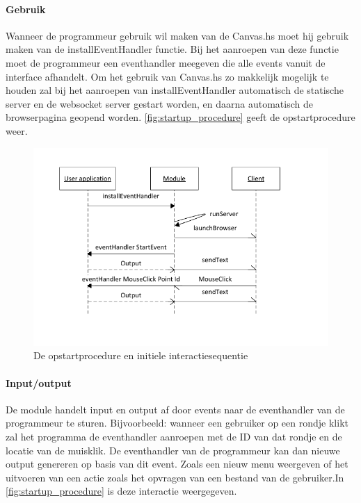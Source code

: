 \paragraph{Gebruik} Wanneer de programmeur gebruik wil maken van de Canvas.hs moet hij gebruik maken van de installEventHandler functie. Bij het aanroepen van deze functie moet de programmeur een eventhandler meegeven die alle events vanuit de interface afhandelt. Om het gebruik van Canvas.hs zo makkelijk mogelijk te houden zal bij het aanroepen van installEventHandler automatisch de statische server en de websocket server gestart worden, en daarna automatisch de browserpagina geopend worden. \autoref{fig:startup_procedure} geeft de opstartprocedure weer.

\begin{figure}
\begin{center}
\includegraphics[keepaspectratio,width=\textwidth]{./images/module_startup_procedure_interaction.pdf}
\caption{De opstartprocedure en initiele interactiesequentie}
\label{fig:startup_procedure}
\end{center}
\end{figure}
\paragraph{Input/output}
De module handelt input en output af door events naar de eventhandler van de programmeur te sturen. Bijvoorbeeld: wanneer een gebruiker op een rondje klikt zal het programma de eventhandler aanroepen met de ID van dat rondje en de locatie van de muisklik. De eventhandler van de programmeur kan dan nieuwe output genereren op basis van dit event. Zoals een nieuw menu weergeven of het uitvoeren van een actie zoals het opvragen van een bestand van de gebruiker.In \autoref{fig:startup_procedure} is deze interactie weergegeven.

